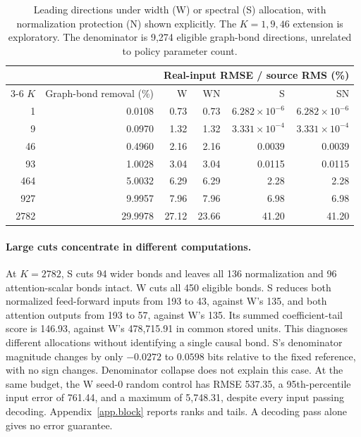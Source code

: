 \documentclass{article}
\begin{document}
\begin{table}[ht]
\centering\small\setlength{\tabcolsep}{7pt}
\begin{tabular}{@{}rr rrrr@{}}
\toprule
& & \multicolumn{4}{c}{Real-input RMSE / source RMS (\%)}\\
\cmidrule(l){3-6}
$K$ & Graph-bond removal (\%) & W & WN & S & SN\\
\midrule
1 & 0.0108 & 0.73 & 0.73 & $6.282\times10^{-6}$ & $6.282\times10^{-6}$\\
9 & 0.0970 & 1.32 & 1.32 & $3.331\times10^{-4}$ & $3.331\times10^{-4}$\\
46 & 0.4960 & 2.16 & 2.16 & 0.0039 & 0.0039\\
93 & 1.0028 & 3.04 & 3.04 & 0.0115 & 0.0115\\
464 & 5.0032 & 6.29 & 6.29 & 2.28 & 2.28\\
927 & 9.9957 & 7.96 & 7.96 & 6.98 & 6.98\\
2782 & 29.9978 & 27.12 & 23.66 & 41.20 & 41.20\\
\bottomrule
\end{tabular}
\caption{Leading directions under width (W) or spectral (S) allocation, with normalization protection (N) shown explicitly. The $K=1,9,46$ extension is exploratory. The denominator is 9,274 eligible graph-bond directions, unrelated to policy parameter count.}
\label{tab.allocation}
\end{table}

\paragraph{Large cuts concentrate in different computations.}
At $K=2782$, S cuts 94 wider bonds and leaves all 136 normalization and 96 attention-scalar bonds intact. W cuts all 450 eligible bonds. S reduces both normalized feed-forward inputs from 193 to 43, against W's 135, and both attention outputs from 193 to 57, against W's 135. Its summed coefficient-tail score is 146.93, against W's 478,715.91 in common stored units. This diagnoses different allocations without identifying a single causal bond. S's denominator magnitude changes by only $-0.0272$ to $0.0598$ bits relative to the fixed reference, with no sign changes. Denominator collapse does not explain this case. At the same budget, the W seed-0 random control has RMSE 537.35, a 95th-percentile input error of 761.44, and a maximum of 5,748.31, despite every input passing decoding. Appendix~\ref{app.block} reports ranks and tails. A decoding pass alone gives no error guarantee.
\end{document}
